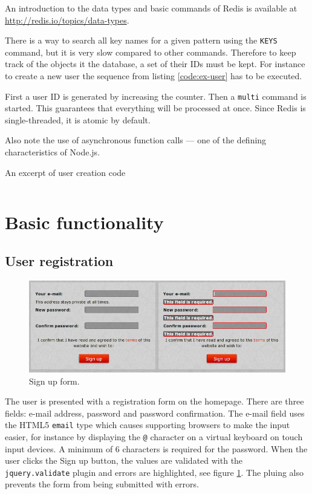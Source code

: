 \documentclass[12pt,oneside]{fithesis}
\begin{document}
	
	An introduction to the data types and basic commands of Redis is available at \url{http://redis.io/topics/data-types}.
	
	There is a way to search all key names for a given pattern using the \texttt{KEYS} command, but it is very slow compared to other commands. Therefore to keep track of the objects it the database, a set of their IDs must be kept. For instance to create a new user the sequence from listing \ref{code:ex-user} has to be executed.
	
	First a user ID is generated by increasing the counter. Then a \texttt{multi} command is started. This guarantees that everything will be processed at once. Since Redis is single-threaded, it is atomic by default.
	
	Also note the use of asynchronous function calls --- one of the defining characteristics of Node.js.
	\begin{program}[h!]
	\caption{An excerpt of user creation code}
	\label{code:ex-user}
	\inputminted[fontsize=\footnotesize, linenos=false]{javascript}{ex-user.js}
	\end{program}
	
	
\section{Basic functionality}
	\subsection{User registration}	
	  \begin{figure}[h]
	  \centering
	    \includegraphics[width=1.0\textwidth]{screen-signup.png}
		  \caption{Sign up form.}
		  \label{fig:screen-signup}
	  \end{figure}
		The user is presented with a registration form on the homepage. There are three fields: e-mail address, password and password confirmation. The e-mail field uses the HTML5 \texttt{email} type which causes supporting browsers to make the input easier, for instance by displaying the \texttt{@} character on a virtual keyboard on touch input devices. A minimum of 6 characters is required for the password. When the user clicks the Sign up button, the values are validated with the \texttt{jquery.validate} plugin and errors are highlighted, see figure \ref{fig:screen-signup}. The pluing also prevents the form from being submitted with errors.
		
\end{document}
